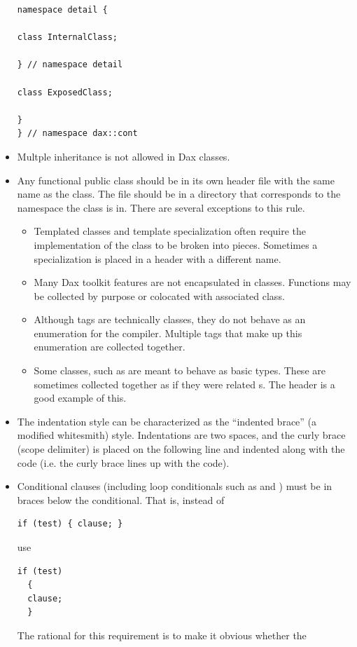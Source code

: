 \begin{itemize}
\begin{verbatim}
namespace detail {

class InternalClass;

} // namespace detail

class ExposedClass;

}
} // namespace dax::cont
\end{verbatim}
\item Multple inheritance is not allowed in Dax classes.
\item Any functional public class should be in its own header file with the
  same name as the class. The file should be in a directory that
  corresponds to the namespace the class is in. There are several
  exceptions to this rule.
  \begin{itemize}
  \item Templated classes and template specialization often require the
    implementation of the class to be broken into pieces. Sometimes a
    specialization is placed in a header with a different name.
  \item Many Dax toolkit features are not encapsulated in
    classes. Functions may be collected by purpose or colocated with
    associated class.
  \item Although tags are technically classes, they do not behave as an
    enumeration for the compiler. Multiple tags that make up this
    enumeration are collected together.
  \item Some classes, such as  are meant to behave as basic
    types. These are sometimes collected together as if they were related
    s. The  header is a good
    example of this.
  \end{itemize}
\item The indentation style can be characterized as the ``indented brace''
  (a modified whitesmith) style. Indentations are two spaces, and the curly
  brace (scope delimiter) is placed on the following line and indented
  along with the code (i.e. the curly brace lines up with the code).
\item Conditional clauses (including loop conditionals such as
   and ) must be in braces below the
  conditional. That is, instead of
  \begin{verbatim}
if (test) { clause; }
\end{verbatim}
  use
  \begin{verbatim}
if (test)
  {
  clause;
  }
\end{verbatim}
  The rational for this requirement is to make it obvious whether the

\end{itemize}
